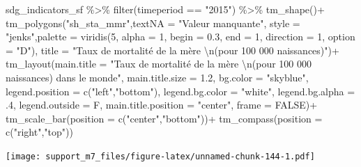 \documentclass[
]{book}
\newenvironment{Shaded}{\begin{snugshade}}{\end{snugshade}}
\newcommand{\AttributeTok}[1]{\textcolor[rgb]{0.77,0.63,0.00}{#1}}
\newcommand{\ConstantTok}[1]{\textcolor[rgb]{0.00,0.00,0.00}{#1}}
\newcommand{\DecValTok}[1]{\textcolor[rgb]{0.00,0.00,0.81}{#1}}
\newcommand{\FloatTok}[1]{\textcolor[rgb]{0.00,0.00,0.81}{#1}}
\newcommand{\FunctionTok}[1]{\textcolor[rgb]{0.00,0.00,0.00}{#1}}
\newcommand{\NormalTok}[1]{#1}
\newcommand{\SpecialCharTok}[1]{\textcolor[rgb]{0.00,0.00,0.00}{#1}}
\newcommand{\StringTok}[1]{\textcolor[rgb]{0.31,0.60,0.02}{#1}}
\begin{document}
\begin{Shaded}
\begin{Highlighting}[]
\NormalTok{sdg\_indicators\_sf }\SpecialCharTok{\%\textgreater{}\%} 
  \FunctionTok{filter}\NormalTok{(timeperiod }\SpecialCharTok{==} \StringTok{"2015"}\NormalTok{) }\SpecialCharTok{\%\textgreater{}\%} 
  \FunctionTok{tm\_shape}\NormalTok{()}\SpecialCharTok{+}
  \FunctionTok{tm\_polygons}\NormalTok{(}\StringTok{"sh\_sta\_mmr"}\NormalTok{,}\AttributeTok{textNA =} \StringTok{"Valeur manquante"}\NormalTok{, }\AttributeTok{style =} \StringTok{"jenks"}\NormalTok{,}\AttributeTok{palette =} \FunctionTok{viridis}\NormalTok{(}\DecValTok{5}\NormalTok{, }\AttributeTok{alpha =} \DecValTok{1}\NormalTok{, }\AttributeTok{begin =} \FloatTok{0.3}\NormalTok{, }\AttributeTok{end =} \DecValTok{1}\NormalTok{, }\AttributeTok{direction =} \DecValTok{1}\NormalTok{, }\AttributeTok{option =} \StringTok{"D"}\NormalTok{),}
              \AttributeTok{title =} \StringTok{"Taux de mortalité de la mère }\SpecialCharTok{\textbackslash{}n}\StringTok{(pour 100 000 naissances)"}\NormalTok{)}\SpecialCharTok{+}
  \FunctionTok{tm\_layout}\NormalTok{(}\AttributeTok{main.title =} \StringTok{"Taux de mortalité de la mère }\SpecialCharTok{\textbackslash{}n}\StringTok{(pour 100 000 naissances) dans le monde"}\NormalTok{,}
            \AttributeTok{main.title.size =} \FloatTok{1.2}\NormalTok{,}
            \AttributeTok{bg.color =} \StringTok{"skyblue"}\NormalTok{,}
            \AttributeTok{legend.position =} \FunctionTok{c}\NormalTok{(}\StringTok{"left"}\NormalTok{,}\StringTok{"bottom"}\NormalTok{),}
            \AttributeTok{legend.bg.color =} \StringTok{"white"}\NormalTok{,}
            \AttributeTok{legend.bg.alpha =}\NormalTok{ .}\DecValTok{4}\NormalTok{,}
            \AttributeTok{legend.outside =}\NormalTok{ F,}
            \AttributeTok{main.title.position =} \StringTok{"center"}\NormalTok{,}
            \AttributeTok{frame =} \ConstantTok{FALSE}\NormalTok{)}\SpecialCharTok{+}
  \FunctionTok{tm\_scale\_bar}\NormalTok{(}\AttributeTok{position =} \FunctionTok{c}\NormalTok{(}\StringTok{"center"}\NormalTok{,}\StringTok{"bottom"}\NormalTok{))}\SpecialCharTok{+}
  \FunctionTok{tm\_compass}\NormalTok{(}\AttributeTok{position =} \FunctionTok{c}\NormalTok{(}\StringTok{"right"}\NormalTok{,}\StringTok{"top"}\NormalTok{))}
\end{Highlighting}
\end{Shaded}

\texttt{[image: support\_m7\_files/figure-latex/unnamed-chunk-144-1.pdf]}
\end{document}
